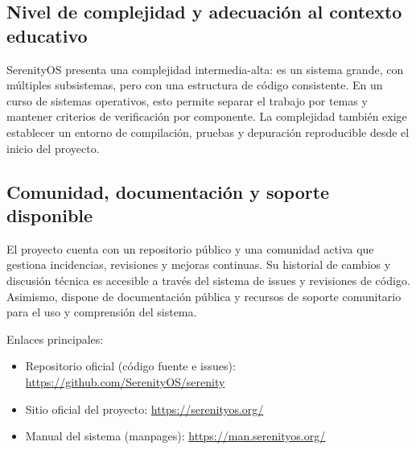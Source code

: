 \subsection{Nivel de complejidad y adecuación al contexto educativo}
SerenityOS presenta una complejidad intermedia-alta: es un sistema grande, con múltiples subsistemas, pero con una estructura de código consistente. En un curso de sistemas operativos, esto permite separar el trabajo por temas y mantener criterios de verificación por componente. La complejidad también exige establecer un entorno de compilación, pruebas y depuración reproducible desde el inicio del proyecto.

\subsection{Comunidad, documentación y soporte disponible}
El proyecto cuenta con un repositorio público y una comunidad activa que gestiona incidencias, revisiones y mejoras continuas. Su historial de cambios y discusión técnica es accesible a través del sistema de issues y revisiones de código. Asimismo, dispone de documentación pública y recursos de soporte comunitario para el uso y comprensión del sistema.

Enlaces principales:
\begin{itemize}
	\item Repositorio oficial (código fuente e issues): \url{https://github.com/SerenityOS/serenity}
	\item Sitio oficial del proyecto: \url{https://serenityos.org/}
	\item Manual del sistema (manpages): \url{https://man.serenityos.org/}
\end{itemize}